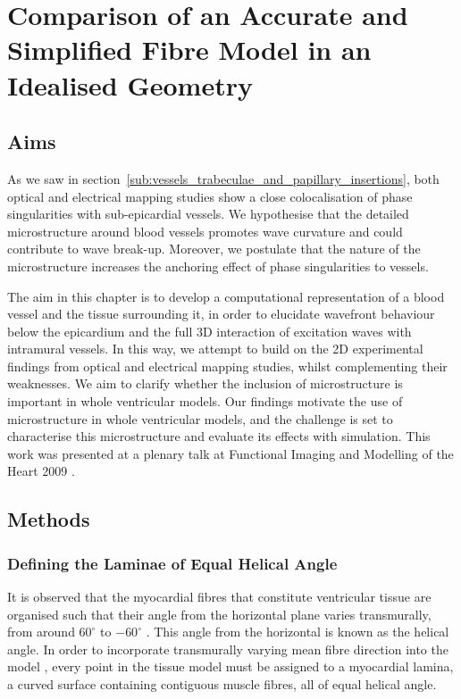 \chapter{Comparison of an Accurate and Simplified Fibre Model in an Idealised Geometry}
\dblspace
\begin{quote}{\em }\end{quote}

\section{Aims}
\label{sec:cha5:aims}
  As we saw in section~\ref{sub:vessels_trabeculae_and_papillary_insertions}, both optical and electrical mapping studies show a close colocalisation of phase singularities with sub-epicardial vessels. We hypothesise that the detailed microstructure around blood vessels promotes wave curvature and could contribute to wave break-up. Moreover, we postulate that the nature of the microstructure increases the anchoring effect of phase singularities to vessels.

  The aim in this chapter is to develop a computational representation of a blood vessel and the tissue surrounding it, in order to elucidate wavefront behaviour below the epicardium and the full 3D interaction of excitation waves with intramural vessels. In this way, we attempt to build on the 2D experimental findings from optical and electrical mapping studies, whilst complementing their weaknesses. We aim to clarify whether the inclusion of microstructure is important in whole ventricular models.  Our findings motivate the use of microstructure in whole ventricular models, and the challenge is set to characterise this microstructure and evaluate its effects with simulation. This work was presented at a plenary talk at Functional Imaging and Modelling of the Heart 2009 \cite{Gibb2009}.

\section{Methods} %
\label{sec:methods}
\subsection{Defining the Laminae of Equal Helical Angle} %
\label{sec:defining_the_laminae_of_equal_helical_angle}
  It is observed that the myocardial fibres that constitute ventricular tissue are organised such that their angle from the horizontal plane varies transmurally, from around $60^\circ$ to $-60^\circ$ \cite{StreeterJr1969}. This angle from the horizontal is known as the helical angle. In order to incorporate transmurally varying mean fibre direction into the model \cite{Potse2006}, every point in the tissue model must be assigned to a myocardial lamina, a curved surface containing contiguous muscle fibres, all of equal helical angle.
  
